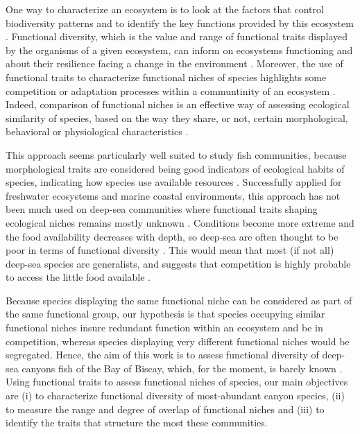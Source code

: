 One way to characterize an ecosystem is to look at the factors that control biodiversity patterns and to identify the key functions provided by this ecosystem \citep{aneeshkumar2017,brindamour2011,farre2016}. Functional diversity, which is the value and range of functional traits displayed by the organisms of a given ecosystem, can inform on ecosystems functioning and about their resilience facing a change in the environment \citep{dumay2004,martini2020}. Moreover, the use of functional traits to characterize functional niches of species highlights some competition or adaptation processes within a communtinity of an ecosystem \citep{aneeshkumar2017}. Indeed, comparison of functional niches is an effective way of assessing ecological similarity of species, based on the way they share, or not, certain morphological, behavioral or physiological characteristics \citep{aneeshkumar2017,farre2016,winemiller1991}.

This approach seems particularly well suited to study fish communities, because morphological traits are considered being good indicators of ecological habits of species, indicating how species use available resources \citep{farre2016,winemiller1991}. Successfully applied for freshwater ecosystems and marine coastal environments, this approach has not been much used on deep-sea communities where functional traits shaping ecological niches remains mostly unknown \citep{aneeshkumar2017,farre2016}. Conditions become more extreme and the food availability decreases with depth, so deep-sea are often thought to be poor in terms of functional diversity \citep{aneeshkumar2017,mason2008,novotny2018}. This would mean that most (if not all) deep-sea species are generalists, and suggests that competition is highly probable to access the little food available .

Because species displaying the same functional niche can be considered as part of the same functional group, our hypothesis is that species occupying similar functional niches insure redundant function within an ecosystem and be in competition, whereas species displaying very different functional niches would be segregated. Hence, the aim of this work is to assess functional diversity of deep-sea canyons fish of the Bay of Biscay, which, for the moment, is barely known \citep{kenchington2020}. Using functional traits to assess functional niches of species, our main objectives are (i) to characterize functional diversity of most-abundant canyon species, (ii) to measure the range and degree of overlap of functional niches and (iii) to identify the traits that structure the most these communities.

